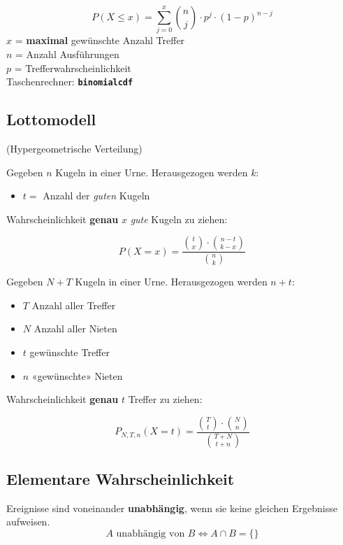 \begin{multicols}{2}
\begin{tcolorbox}[colback=white]
$$P(X\le x) = \sum_{j=0}^{x}{n \choose j}\cdot{}p^j\cdot{}(1-p)^{n-j}$$
$x$ = \textbf{maximal} gewünschte Anzahl Treffer\\
$n$ = Anzahl Ausführungen\\
$p$ = Trefferwahrscheinlichkeit\\
Taschenrechner: \textbf{\texttt{binomialcdf}}
\end{tcolorbox}


\subsection*{Lottomodell}
(Hypergeometrische Verteilung)

\ifisRLP
\begin{tcolorbox}[colback=white]
Gegeben $n$ Kugeln in einer Urne. Herausgezogen werden $k$:
\begin{itemize}
\item $t =$ Anzahl der \textit{guten} Kugeln
\end{itemize}
Wahrscheinlichkeit \textbf{genau} $x$ \textit{gute} Kugeln zu ziehen:

$$P(X=x) = \frac{ {t \choose x} \cdot {n-t  \choose k-x} }{{n \choose k}}$$
\end{tcolorbox}
\else
\begin{tcolorbox}[colback=white]
Gegeben $N+T$ Kugeln in einer Urne. Herausgezogen werden $n+t$:
\begin{itemize}
\item $T$ Anzahl aller Treffer
\item $N$ Anzahl aller Nieten
\item $t$ gewünschte Treffer
\item $n$ «gewünschte» Nieten
\end{itemize}
Wahrscheinlichkeit \textbf{genau} $t$ Treffer zu ziehen:

$$P_{N,T,n}(X=t) = \frac{ {T \choose t} \cdot {N  \choose n} }{{T+N \choose t+n}}$$
\end{tcolorbox}
\fi%


\subsection*{Elementare Wahrscheinlichkeit}
Ereignisse sind voneinander \textbf{unabhängig}, wenn sie keine
gleichen Ergebnisse aufweisen.
$$A \textrm{ unabhängig von } B \Leftrightarrow A\cap B=\{\}$$


\end{multicols}
